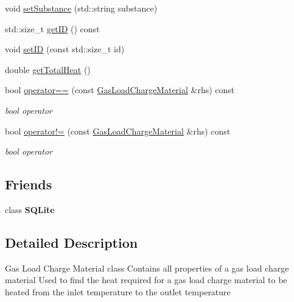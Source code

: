 \begin{DoxyCompactItemize}
void \hyperlink{class_gas_load_charge_material_a20cc3df601d8daae9b8f8e7b0c53c2e3}{set\+Substance} (std\+::string substance)
\item 
std\+::size\+\_\+t \hyperlink{class_gas_load_charge_material_a32dc0d73857ebe4322cf525064713cf6}{get\+ID} () const
\item 
void \hyperlink{class_gas_load_charge_material_a24b43ba7c871453258f458a8c1f15232}{set\+ID} (const std\+::size\+\_\+t id)
\item 
double \hyperlink{class_gas_load_charge_material_a4f831537652ca09c4539982c626cc164}{get\+Total\+Heat} ()
\item 
\mbox{\label{class_gas_load_charge_material_ac1d95bdf7d61d8ed98629aa17bf2c4b1}} 
bool \hyperlink{class_gas_load_charge_material_ac1d95bdf7d61d8ed98629aa17bf2c4b1}{operator==} (const \hyperlink{class_gas_load_charge_material}{Gas\+Load\+Charge\+Material} \&rhs) const
\begin{DoxyCompactList}\small\item\em bool operator \end{DoxyCompactList}\item 
\mbox{\label{class_gas_load_charge_material_ac6bc3f665a91fde01ebf6d1528cb7332}} 
bool \hyperlink{class_gas_load_charge_material_ac6bc3f665a91fde01ebf6d1528cb7332}{operator!=} (const \hyperlink{class_gas_load_charge_material}{Gas\+Load\+Charge\+Material} \&rhs) const
\begin{DoxyCompactList}\small\item\em bool operator \end{DoxyCompactList}\end{DoxyCompactItemize}
\subsection*{Friends}
\begin{DoxyCompactItemize}
\item 
\mbox{\label{class_gas_load_charge_material_ac7d22f3ca36435f73d55df60dc799e14}} 
class {\bfseries S\+Q\+Lite}
\end{DoxyCompactItemize}


\subsection{Detailed Description}
Gas Load Charge Material class Contains all properties of a gas load charge material Used to find the heat required for a gas load charge material to be heated from the inlet temperature to the outlet temperature 

